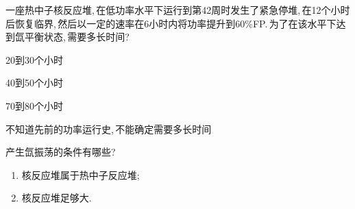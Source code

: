\begin{exercise}
    一座热中子核反应堆,\,在低功率水平下运行到第42周时发生了紧急停堆,\,在12个小时后恢复临界,\,然后以一定的速率在6小时内将功率提升到60\%FP.\,为了在该水平下达到氙平衡状态,\,需要多长时间?\,\xparen
    \begin{xchoices}[showanswer=true]
        \item 20到30个小时
        \item* 40到50个小时
        \item 70到80个小时
        \item 不知道先前的功率运行史,\,不能确定需要多长时间
    \end{xchoices}
    \vspace{1em}
\end{exercise}

\begin{exercise}
    产生氙振荡的条件有哪些?\,
    \begin{solution}
        \begin{enumerate}[(1)]
            \item 核反应堆属于热中子反应堆;
            \item 核反应堆足够大.
        \end{enumerate}
    \end{solution}
\end{exercise}